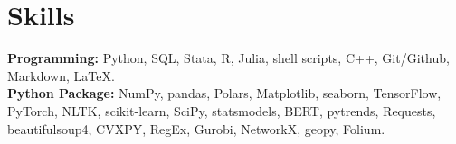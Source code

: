 \documentclass{academicThemeCV}
\begin{document}
\section{Skills}
  \vspace{1pt}
  \resumeSubHeadingListStart
    \vspace{-5pt}
    \small{\item{
        \textbf{Programming: }{Python, SQL, Stata, R, Julia, shell scripts,
        C++, Git/Github, Markdown, \LaTeX.} \\[3pt]
        \textbf{Python Package: }{
        NumPy, pandas, Polars, Matplotlib, seaborn, 
        TensorFlow, PyTorch, NLTK, scikit-learn, SciPy, statsmodels,
        BERT, pytrends, Requests, beautifulsoup4, CVXPY, RegEx, 
        Gurobi, NetworkX, geopy, Folium.} \\[3pt]
        
    }}
  \resumeSubHeadingListEnd



\end{document}
